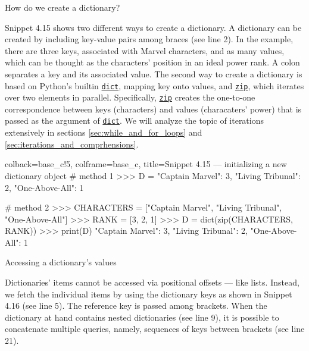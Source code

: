 \documentclass[a4paper,11pt]{book}
\numberwithin{figure}{chapter}
\numberwithin{table}{chapter}
\newcommand{\question}[1]{%
    \begin{tcolorbox}[colback=comp_c!10,colframe=comp_c,sidebyside align=top,width=\linewidth,before skip=1ex]
        #1
    \end{tcolorbox}%
    \switchcolumn%
}
\newcommand{\note}[1]{%
    \begin{tcolorbox}[colback=white!0,colframe=white!10,width=\linewidth,before skip=1ex]
        #1
    \end{tcolorbox}         
}
\begin{document}
\begin{paracol}{2}
	\question{\raggedright How do we create a dictionary?}
	\note{Snippet 4.15 shows two different ways to create a dictionary. A dictionary can be created by including key-value pairs among braces (see line 2). In the example, there are three keys, associated with Marvel characters, and as many values, which can be thought as the characters' position in an ideal power rank. A colon separates a key and its associated value. The second way to create a dictionary is based on Python's builtin \href{https://docs.python.org/3/library/stdtypes.html#dict}{\texttt{dict}}, mapping key onto values, and \href{https://docs.python.org/3/library/functions.html#zip}{\texttt{zip}}, which iterates over two elements in parallel. Specifically, \href{https://docs.python.org/3/library/functions.html#zip}{\texttt{zip}} creates the one-to-one correspondence between keys (characters) and values (characaters' power) that is passed as the argument of \href{https://docs.python.org/3/library/stdtypes.html#dict}{\texttt{dict}}. We will analyze the topic of iterations extensively in sections \ref{sec:while_and_for_loops} and \ref{sec:iterations_and_comprhensions}.}
\end{paracol}

\begin{pythoncode}[linenos=true,]{colback=base_c!5, colframe=base_c, title=\sffamily Snippet 4.15 --- initializing a new dictionary object}
# method 1 
>>> D = {"Captain Marvel": 3, "Living Tribunal": 2, "One-Above-All": 1}

# method 2
>>> CHARACTERS = ["Captain Marvel", "Living Tribunal", "One-Above-All"]
>>> RANK = [3, 2, 1]
>>> D = dict(zip(CHARACTERS, RANK)) 
>>> print(D)
{"Captain Marvel": 3, "Living Tribunal": 2, "One-Above-All": 1}
\end{pythoncode}
\clearpage

\begin{paracol}{2}
	\question{\raggedright Accessing a dictionary's values}
	\note{Dictionaries' items cannot be accessed via positional offsets --- like lists. Instead, we fetch the individual items by using the dictionary keys as shown in Snippet 4.16 (see line 5). The reference key is passed among brackets. When the dictionary at hand contains nested dictionaries (see line 9), it is possible to concatenate multiple queries, namely, sequences of keys between brackets (see line 21).}
\end{paracol}
\end{document}
